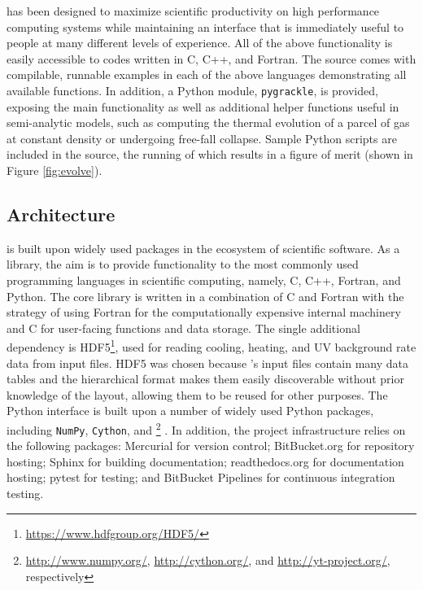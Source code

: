 \grackle{} has been designed to maximize scientific productivity on
high performance computing systems while maintaining an interface that
is immediately useful to people at many different levels of
experience.
All of the above functionality is easily accessible to codes written
in C, C++, and Fortran.  The \grackle{} source comes with compilable,
runnable examples in each of the above languages demonstrating all
available functions.  In addition, a Python module, \texttt{pygrackle},
is provided, exposing the main functionality as well as additional helper
functions useful in semi-analytic models, such as computing the
thermal evolution of a parcel of gas at constant density or undergoing
free-fall collapse.  Sample Python scripts are included in the source,
the running of which results in a figure of merit (shown in Figure
\ref{fig:evolve}).

\subsection{\grackle{} Architecture}

\grackle{} is built upon widely used packages in the ecosystem of
scientific software.  As a library, the aim is to provide
functionality to the most commonly used programming languages in
scientific computing, namely, C, C++, Fortran, and Python.  The core
library is written in a combination of C and Fortran with the strategy
of using Fortran for the computationally expensive internal machinery
and C for user-facing functions and data storage.  The single
additional dependency is
HDF5\footnote{\url{https://www.hdfgroup.org/HDF5/}}, used for reading
cooling, heating,
and UV background rate data from input files.  HDF5 was chosen because
\grackle{}'s input files contain many data tables and the hierarchical
format makes them easily discoverable without prior knowledge of the
layout, allowing them to be reused for other purposes.  The Python
interface is built upon a number of widely used Python packages, including
\texttt{NumPy}, \texttt{Cython}, and
\yt{}\footnote{\url{http://www.numpy.org/}, \url{http://cython.org/},
  and \url{http://yt-project.org/}, respectively} \citep[][an SI2-funded
project]{2011ApJS..192....9T}.  In
addition, the project infrastructure relies on the following packages:
Mercurial for version control; BitBucket.org for repository hosting;
Sphinx for building documentation; readthedocs.org for documentation
hosting; pytest for testing; and BitBucket Pipelines for continuous
integration testing.

